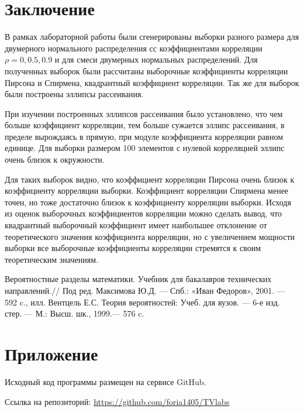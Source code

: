 \documentclass[12pt]{article}
\begin{document}
\newpage
 \section*{Заключение}
{}
\par В рамках лабораторной работы были сгенерированы выборки разного размера для двумерного нормального распределения сс коэффициентами корреляции $\rho = 0, 0.5, 0.9$  и для смеси двумерных нормальных распределений.  Для полученных выборок были рассчитаны выборочные коэффициенты корреляции Пирсона и Спирмена, квадрантный коэффициент корреляции. Так же для выборок были построены эллипсы рассеивания.


При изучении построенных эллипсов рассеивания было установлено, что чем больше коэффициент корреляции, тем больше сужается эллипс рассеивания, в пределе вырождаясь в прямую, при модуле коэффициента корреляции равном единице. Для выборки размером 100 элементов с нулевой корреляцией эллипс очень близок к окружности. 

Для таких выборок видно, что коэффициент корреляции Пирсона очень близок к коэффициенту корреляции выборки. Коэффициент корреляции Спирмена менее точен, но тоже достаточно близок к коэффициенту корреляции выборки.
Исходя из оценок выборочных коэффициентов корреляции можно сделать вывод, что квадрантный выборочный коэффициент имеет наибольшее отклонение от теоретического значения коэффициента корреляции, но с увеличением мощности выборки все выборочные коэффициенты корреляции стремятся к своим теоретическим значениям.\\


\newpage

\begin{thebibliography}{}
	  Вероятностные разделы математики. Учебник для бакалавров технических направлений.// Под ред. Максимова Ю.Д. — Спб.: «Иван Федоров», 2001. — 592 c., илл.
	  Вентцель Е.С. Теория вероятностей: Учеб. для вузов. — 6-е изд. стер. — М.: Высш. шк., 1999.— 576 c.
\end{thebibliography}
\newpage
\appendix


\section{Приложение}
\label{sec:A}
\par Исходный код программы размещен на сервисе GitHub.
\par Ссылка на репозиторий: \url{https://github.com/foria1405/TVlabs}
\end{document}
